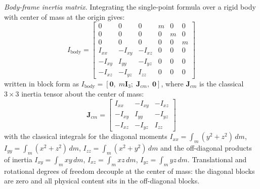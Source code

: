 \emph{Body-frame inertia matrix.} Integrating the single-point formula over a rigid body
with center of mass at the origin gives:
\begin{equation}
    I_\mathrm{body} =
    \begin{bmatrix}
        0       & 0       & 0       &  m   & 0    & 0    \\
        0       & 0       & 0       &  0   & m    & 0    \\
        0       & 0       & 0       &  0   & 0    & m    \\
        I_{xx}  & -I_{xy} & -I_{xz} &  0   & 0    & 0    \\
        -I_{xy} &  I_{yy} & -I_{yz} &  0   & 0    & 0    \\
        -I_{xz} & -I_{yz} &  I_{zz} &  0   & 0    & 0
    \end{bmatrix}
    \label{eq:inertia_3D_body}
\end{equation}
written in block form as $I_\mathrm{body} = [\mathbf{0},\; m\mathbf{I}_3;\;
\mathbf{J}_{cm},\; \mathbf{0}]$, where $\mathbf{J}_{cm}$ is the classical $3\times3$
inertia tensor about the center of mass:
\begin{equation}
    \mathbf{J}_{cm} =
    \begin{bmatrix}
        I_{xx}  & -I_{xy} & -I_{xz} \\
        -I_{xy} &  I_{yy} & -I_{yz} \\
        -I_{xz} & -I_{yz} &  I_{zz}
    \end{bmatrix}
    \label{eq:classical_inertia_tensor}
\end{equation}
with the classical integrals for the diagonal moments $I_{xx} = \int_m (y^2+z^2)\,dm$,
$I_{yy} = \int_m (x^2+z^2)\,dm$, $I_{zz} = \int_m (x^2+y^2)\,dm$ and the off-diagonal
products of inertia $I_{xy} = \int_m xy\,dm$, $I_{xz} = \int_m xz\,dm$, $I_{yz} = \int_m
yz\,dm$. Translational and rotational degrees of freedom decouple at the center of mass:
the diagonal blocks are zero and all physical content sits in the off-diagonal blocks. \\


